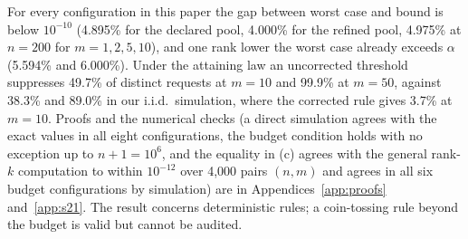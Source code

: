 For every configuration in this paper the gap between worst case and bound is below $10^{-10}$ (4.895\% for the declared pool, 4.000\% for the refined pool, 4.975\% at $n=200$ for $m=1,2,5,10$), and one rank lower the worst case already exceeds $\alpha$ (5.594\% and 6.000\%). Under the attaining law an uncorrected threshold suppresses 49.7\% of distinct requests at $m=10$ and 99.9\% at $m=50$, against 38.3\% and 89.0\% in our i.i.d.\ simulation, where the corrected rule gives 3.7\% at $m=10$. Proofs and the numerical checks (a direct simulation agrees with the exact values in all eight configurations, the budget condition holds with no exception up to $n+1=10^6$, and the equality in (c) agrees with the general rank-$k$ computation to within $10^{-12}$ over 4,000 pairs $(n,m)$ and agrees in all six budget configurations by simulation) are in Appendices~\ref{app:proofs} and~\ref{app:s21}. The result concerns deterministic rules; a coin-tossing rule beyond the budget is valid but cannot be audited.
